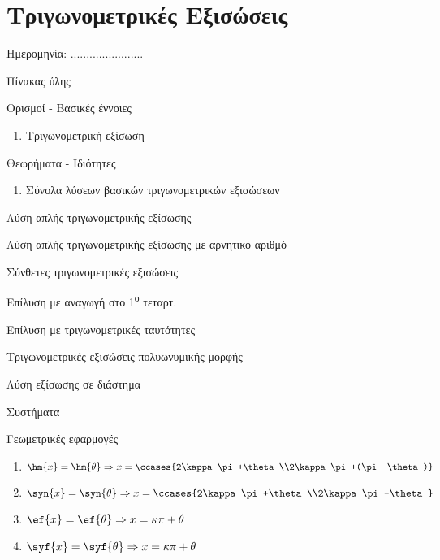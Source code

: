 \documentclass[twoside,nofonts,internet,math,spyros]{frontisthrio}
\newcommand{\tss}[1]{\textsuperscript{#1}}
\newcommand{\myitem}{\stepcounter{enumi}\item[\raisebox{0.5mm}{\faExclamationTriangle}\ \Large$\square$]}
\begin{document}
\section{Τριγωνομετρικές Εξισώσεις}
\begin{flushright}
\faCalendar* Ημερομηνία: .......................
\end{flushright}
\begin{mybox}[mysubtitle]{Πίνακας ύλης}
\begin{tcbraster}[raster columns=2,raster equal height]
\begin{myleftbox}{Ορισμοί - Βασικές έννοιες\ \ \faBook}
\begin{enumerate}[itemsep=0mm]
\item Τριγωνομετρική εξίσωση
\end{enumerate}
\end{myleftbox}
\begin{myrightbox}{Θεωρήματα - Ιδιότητες\ \ \faTools}
\begin{enumerate}[itemsep=0mm]
\item Σύνολα λύσεων βασικών τριγωνομετρικών εξισώσεων
\end{enumerate}
\end{myrightbox}
\end{tcbraster}
\begin{multicols}{2}
\begin{todolist}[itemsep=0mm]
\myitem Λύση απλής τριγωνομετρικής εξίσωσης
\myitem Λύση απλής τριγωνομετρικής εξίσωσης με αρνητικό αριθμό
\item Σύνθετες τριγωνομετρικές εξισώσεις
\item Επίλυση με αναγωγή στο 1\tss{ο} τεταρτ.
\item Επίλυση με τριγωνομετρικές ταυτότητες
\item Τριγωνομετρικές εξισώσεις πολυωνυμικής μορφής
\item Λύση εξίσωσης σε διάστημα
\item Συστήματα
\item Γεωμετρικές εφαρμογές
\end{todolist}
\end{multicols}
\begin{multicols}{2}
\begin{enumerate}[itemsep=0mm]
\item $ \hm{x}=\hm{\theta}\Rightarrow\\ x=\ccases{2\kappa\pi+\theta\\2\kappa\pi+(\pi-\theta)} $
\item $ \syn{x}=\syn{\theta}\Rightarrow x=\ccases{2\kappa\pi+\theta\\2\kappa\pi-\theta} $
\item $\ef{x}=\ef{\theta}\Rightarrow x=\kappa\pi+\theta$
\item $\syf{x}=\syf{\theta}\Rightarrow x=\kappa\pi+\theta$
\end{enumerate}
\end{multicols}
\end{mybox}
\newpage
\end{document}
